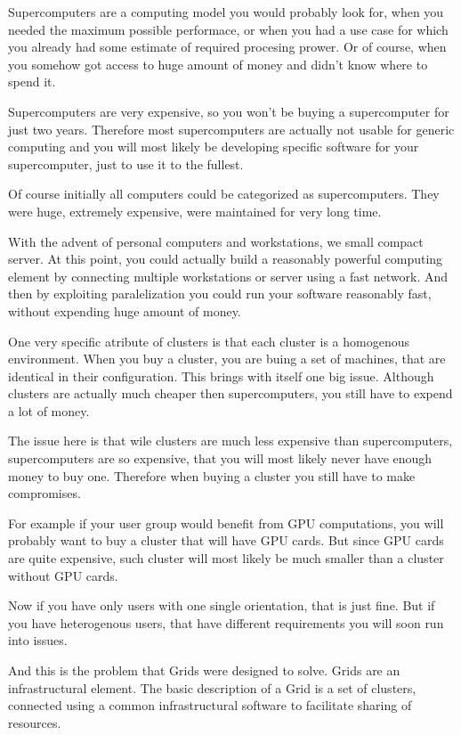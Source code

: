 \documentclass[10pt]{article}
\begin{document}
Supercomputers are a computing model you would probably look for, when you needed the
maximum possible performace, or when you had a use case for which you already
had some estimate of required procesing prower. Or of course, when you somehow
got access to huge amount of money and didn't know where to spend it.

Supercomputers are very expensive, so you won't be buying a supercomputer for
just two years. Therefore most supercomputers are actually not usable for
generic computing and you will most likely be developing specific software for
your supercomputer, just to use it to the fullest.

Of course initially all computers could be categorized as supercomputers. They
were huge, extremely expensive, were maintained for very long time.

With the advent of personal computers and workstations, we small compact server.
At this point, you could actually build a reasonably powerful computing element
by connecting multiple workstations or server using a fast network. And then by
exploiting paralelization you could run your software reasonably fast, without
expending huge amount of money.

One very specific atribute of clusters is that each cluster is a homogenous
environment. When you buy a cluster, you are buing a set of machines, that are
identical in their configuration. This brings with itself one big issue.
Although clusters are actually much cheaper then supercomputers, you still have
to expend a lot of money.

The issue here is that wile clusters are much less expensive than
supercomputers, supercomputers are so expensive, that you will most likely
never have enough money to buy one. Therefore when buying a cluster you still
have to make compromises.

For example if your user group would benefit from GPU computations, you will
probably want to buy a cluster that will have GPU cards. But since GPU cards
are quite expensive, such cluster will most likely be much smaller than a
cluster without GPU cards.

Now if you have only users with one single orientation, that is just fine. But
if you have heterogenous users, that have different requirements you will soon
run into issues.

And this is the problem that Grids were designed to solve. Grids are an
infrastructural element.  The basic description of a Grid is a set of clusters,
connected using a common infrastructural software to facilitate sharing of
resources.
\end{document}
